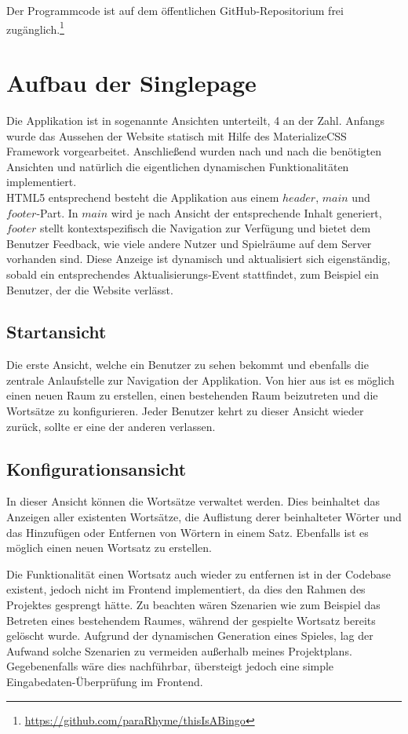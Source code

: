\documentclass[12pt]{scrartcl}
\begin{document}
	Der Programmcode ist auf dem öffentlichen GitHub-Repositorium frei zugänglich.\footnote{\url{https://github.com/paraRhyme/thisIsABingo}}

\section{Aufbau der Singlepage}

	Die Applikation ist in sogenannte Ansichten unterteilt, 4 an der Zahl. Anfangs wurde das Aussehen der Website statisch mit Hilfe des MaterializeCSS Framework vorgearbeitet. Anschließend wurden nach und nach die benötigten Ansichten und natürlich die eigentlichen dynamischen Funktionalitäten implementiert.\\
	
	HTML5 entsprechend besteht die Applikation aus einem $header$, $main$ und $footer$-Part. In $main$ wird je nach Ansicht der entsprechende Inhalt generiert, $footer$ stellt kontextspezifisch die Navigation zur Verfügung und bietet dem Benutzer Feedback, wie viele andere Nutzer und Spielräume auf dem Server vorhanden sind. Diese Anzeige ist dynamisch und aktualisiert sich eigenständig, sobald ein entsprechendes Aktualisierungs-Event stattfindet, zum Beispiel ein Benutzer, der die Website verlässt.

	\subsection{Startansicht}
	
		Die erste Ansicht, welche ein Benutzer zu sehen bekommt und ebenfalls die zentrale Anlaufstelle zur Navigation der Applikation. Von hier aus ist es möglich einen neuen Raum zu erstellen, einen bestehenden Raum beizutreten und die Wortsätze zu konfigurieren. Jeder Benutzer kehrt zu dieser Ansicht wieder zurück, sollte er eine der anderen verlassen.
	
	\subsection{Konfigurationsansicht}
	
		In dieser Ansicht können die Wortsätze verwaltet werden. Dies beinhaltet das Anzeigen aller existenten Wortsätze, die Auflistung derer beinhalteter Wörter und das Hinzufügen oder Entfernen von Wörtern in einem Satz. Ebenfalls ist es möglich einen neuen Wortsatz zu erstellen.
		
		Die Funktionalität einen Wortsatz auch wieder zu entfernen ist in der Codebase existent, jedoch nicht im Frontend implementiert, da dies den Rahmen des Projektes gesprengt hätte. Zu beachten wären Szenarien wie zum Beispiel das Betreten eines bestehendem Raumes, während der gespielte Wortsatz bereits gelöscht wurde. Aufgrund der dynamischen Generation eines Spieles, lag der Aufwand solche Szenarien zu vermeiden außerhalb meines Projektplans. Gegebenenfalls wäre dies nachführbar, übersteigt jedoch eine simple Eingabedaten-Überprüfung im Frontend.
	
\end{document}
